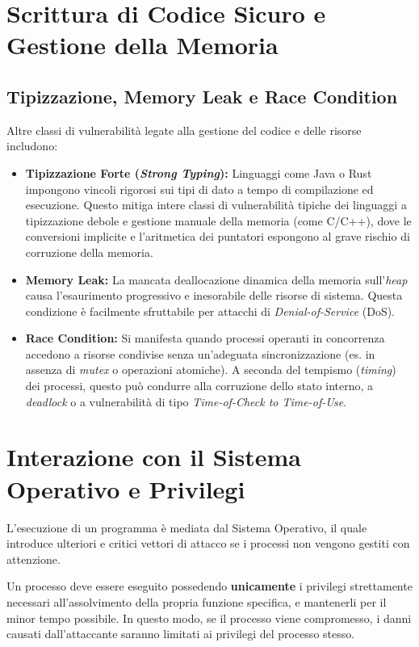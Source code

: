 \section{Scrittura di Codice Sicuro e Gestione della Memoria}
\subsection{Tipizzazione, Memory Leak e Race Condition}
Altre classi di vulnerabilità legate alla gestione del codice e delle risorse includono:

\begin{itemize}
    \item \textbf{Tipizzazione Forte (\textit{Strong Typing}):} Linguaggi come Java o Rust impongono vincoli rigorosi sui tipi di dato a tempo di compilazione ed esecuzione. Questo mitiga intere classi di vulnerabilità tipiche dei linguaggi a tipizzazione debole e gestione manuale della memoria (come C/C++), dove le conversioni implicite e l'aritmetica dei puntatori espongono al grave rischio di corruzione della memoria.
    \item \textbf{Memory Leak:} La mancata deallocazione dinamica della memoria sull'\textit{heap} causa l'esaurimento progressivo e inesorabile delle risorse di sistema. Questa condizione è facilmente sfruttabile per attacchi di \textit{Denial-of-Service} (DoS).
    \item \textbf{Race Condition:} Si manifesta quando processi operanti in concorrenza accedono a risorse condivise senza un'adeguata sincronizzazione (es. in assenza di \textit{mutex} o operazioni atomiche). A seconda del tempismo (\textit{timing}) dei processi, questo può condurre alla corruzione dello stato interno, a \textit{deadlock} o a vulnerabilità di tipo \textit{Time-of-Check to Time-of-Use}.
\end{itemize}

\section{Interazione con il Sistema Operativo e Privilegi}
L'esecuzione di un programma è mediata dal Sistema Operativo, il quale introduce ulteriori e critici vettori di attacco se i processi non vengono gestiti con attenzione.

\begin{defbox}
Un processo deve essere eseguito possedendo \textbf{unicamente} i privilegi strettamente necessari all'assolvimento della propria funzione specifica, e mantenerli per il minor tempo possibile. In questo modo, se il processo viene compromesso, i danni causati dall'attaccante saranno limitati ai privilegi del processo stesso.
\end{defbox}

